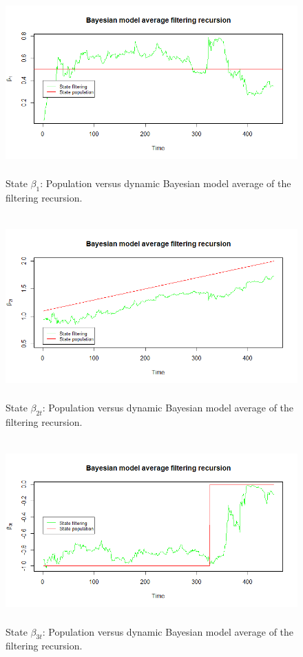 \begin{figure}[!h]
	\includegraphics[width=340pt, height=200pt]{Chapters/chapter10/figures/figPMPdbma1.png}
	\caption[List of figure caption goes here]{State $\beta_{1}$: Population versus dynamic Bayesian model average of the filtering recursion.}\label{figPMPdbma1}
\end{figure}

\begin{figure}[!h]
	\includegraphics[width=340pt, height=200pt]{Chapters/chapter10/figures/figPMPdbma2.png}
	\caption[List of figure caption goes here]{State $\beta_{2t}$: Population versus dynamic Bayesian model average of the filtering recursion.}\label{figPMPdbma2}
\end{figure}

\begin{figure}[!h]
	\includegraphics[width=340pt, height=200pt]{Chapters/chapter10/figures/figPMPdbma3.png}
	\caption[List of figure caption goes here]{State $\beta_{3t}$: Population versus dynamic Bayesian model average of the filtering recursion.}\label{figPMPdbma3}
\end{figure}


